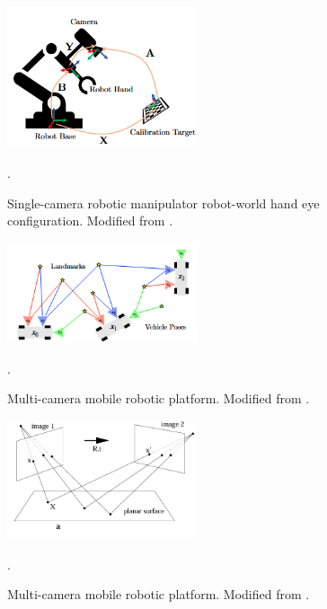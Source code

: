 \documentclass[12pt]{article}
\begin{document}
\begin{figure}[h!]
  \begin{center}
  \centering\includegraphics[width=0.5\textwidth]{Images/Wang_EOH.png}
  \caption{Single-camera robotic manipulator robot-world hand eye 
  configuration. Modified from \cite{Wang_2022}.}.
  \label{Wang_EOH}
  \end{center}
\end{figure}

\begin{figure}[ht!]
  \begin{center}
  \centering\includegraphics[width=0.5\textwidth]{Images/OASIS_CFG.png}
  \caption{Multi-camera mobile robotic platform. 
  Modified from \cite{OASIS_2024}.}.
  \label{OASIS}
  \end{center}
\end{figure}

\begin{figure}[ht!]
  \begin{center}
  \centering\includegraphics[width=0.5\textwidth]{Images/MULTIVIEW.png}
  \caption{Multi-camera mobile robotic platform. 
  Modified from \cite{Hartley_Zisserman}.}.
  \label{MV_HZ}
  \end{center}
\end{figure}
\end{document}
